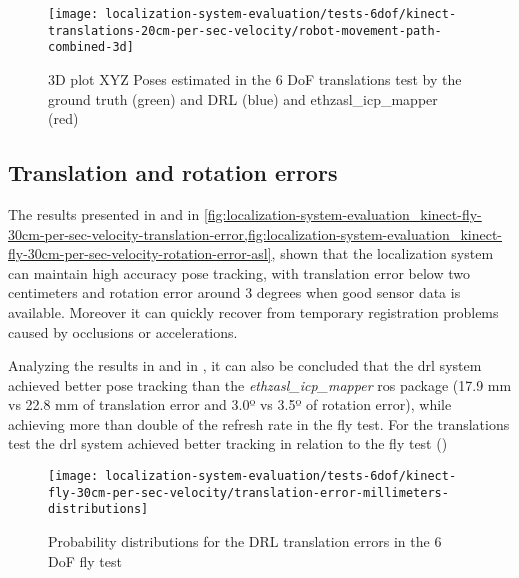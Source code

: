 \begin{figure}[H]
	\centering
	\texttt{[image: localization-system-evaluation/tests-6dof/kinect-translations-20cm-per-sec-velocity/robot-movement-path-combined-3d]}
	\caption{3D plot XYZ Poses estimated in the 6 DoF translations test by the ground truth (green) and DRL (blue) and ethzasl\_icp\_mapper (red)}
	\label{fig:localization-system-evaluation_kinect-translations-robot-movement-path-combined-3d}
\end{figure}

\subsection{Translation and rotation errors}

The results presented in  and in \cref{fig:localization-system-evaluation_kinect-fly-30cm-per-sec-velocity-translation-error,fig:localization-system-evaluation_kinect-fly-30cm-per-sec-velocity-rotation-error-asl}, shown that the localization system can maintain high accuracy pose tracking, with translation error below two centimeters and rotation error around 3 degrees when good sensor data is available. Moreover it can quickly recover from temporary registration problems caused by occlusions or accelerations.

Analyzing the results in  and in , it can also be concluded that the \gls{drl} system achieved better pose tracking than the \emph{ethzasl\_icp\_mapper} \gls{ros} package (17.9 mm vs 22.8 mm of translation error and 3.0º vs 3.5º of rotation error), while achieving more than double of the refresh rate in the fly test. For the translations test the \gls{drl} system achieved better tracking in relation to the fly test ()




\begin{figure}[H]
	\centering
	\texttt{[image: localization-system-evaluation/tests-6dof/kinect-fly-30cm-per-sec-velocity/translation-error-millimeters-distributions]}
	\caption{Probability distributions for the DRL translation errors in the 6 DoF fly test}
	\label{fig:localization-system-evaluation_kinect-fly-30cm-per-sec-velocity-translation-error}
\end{figure}

